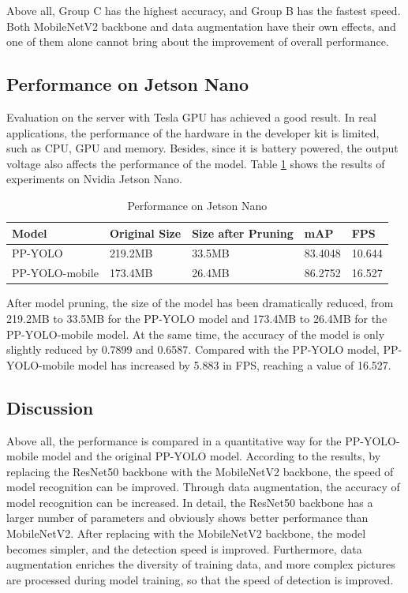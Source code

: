 \documentclass[sensors,article,submit,moreauthors,pdftex]{Definitions/mdpi}
\begin{document}
\begin{paracol}{2}
Above all, Group C has the highest accuracy, and Group B has the fastest speed. Both MobileNetV2 backbone and data augmentation have their own effects, and one of them alone cannot bring about the improvement of overall performance.


\subsection{Performance on Jetson Nano}
Evaluation on the server with Tesla GPU has achieved a good result. In real applications, the performance of the hardware in the developer kit is limited, such as CPU, GPU and memory. Besides, since it is battery powered, the output voltage also affects the performance of the model. Table \ref{tbl:performance on Jetson Nano} shows the results of experiments on Nvidia Jetson Nano.


\begin{table}[H]
\centering
\caption{Performance on Jetson Nano}
\begin{tabular}{lllll} 
\toprule
\textbf{Model}&\textbf{Original Size}&\textbf{Size after Pruning}&\textbf{mAP}&\textbf{FPS}\\
\midrule
PP-YOLO  & 219.2MB&33.5MB&83.4048&10.644\\
PP-YOLO-mobile &173.4MB & 26.4MB&86.2752&16.527\\
\bottomrule
\end{tabular}
\label{tbl:performance on Jetson Nano}
\end{table}


After model pruning, the size of the model has been dramatically reduced, from 219.2MB to 33.5MB for the PP-YOLO model and 173.4MB to 26.4MB for the PP-YOLO-mobile model. At the same time, the accuracy of the model is only slightly reduced by 0.7899 and 0.6587. Compared with the PP-YOLO model, PP-YOLO-mobile model has increased by 5.883 in FPS, reaching a value of 16.527.



\subsection{Discussion}
Above all, the performance is compared in a quantitative way for the PP-YOLO-mobile model and the original PP-YOLO model. According to the results, by replacing the ResNet50 backbone with the MobileNetV2 backbone, the speed of model recognition can be improved. Through data augmentation, the accuracy of model recognition can be increased. In detail, the ResNet50 backbone has a larger number of parameters and obviously shows better performance than MobileNetV2. After replacing with the MobileNetV2 backbone, the model becomes simpler, and the detection speed is improved. Furthermore, data augmentation enriches the diversity of training data, and more complex pictures are processed during model training, so that the speed of detection is improved.


\end{paracol}
\end{document}
